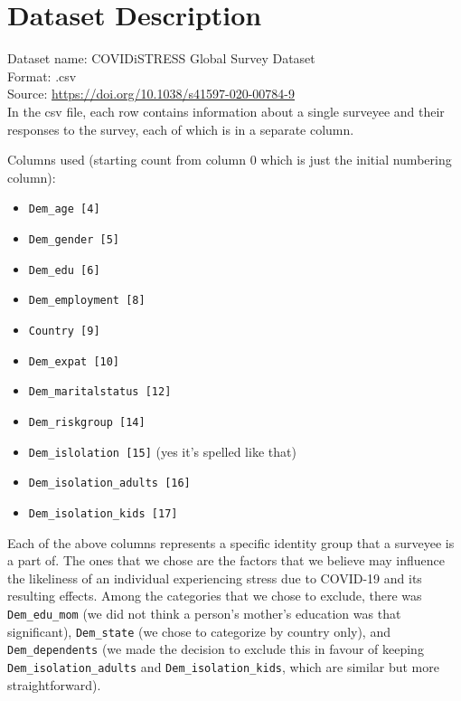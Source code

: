 \documentclass[fontsize=11pt]{article}
\begin{document}
    \section*{Dataset Description}

    Dataset name: COVIDiSTRESS Global Survey Dataset \\
    Format: .csv \\
    Source: \url{https://doi.org/10.1038/s41597-020-00784-9} \\

    In the csv file, each row contains information about a single surveyee and their responses to the survey, each of which is in a separate column.

    Columns used (starting count from column 0 which is just the initial numbering column):
    \begin{itemize}
    	\item \texttt{Dem\_age [4]} 
    	\item \texttt{Dem\_gender [5]} 
    	\item \texttt{Dem\_edu [6]} 
    	\item \texttt{Dem\_employment [8]} 
    	\item \texttt{Country [9]} 
    	\item \texttt{Dem\_expat [10]} 
    	\item \texttt{Dem\_maritalstatus [12]}  
    	\item \texttt{Dem\_riskgroup [14]} 
    	\item \texttt{Dem\_islolation [15]}  (yes it's spelled like that)
    	\item \texttt{Dem\_isolation\_adults [16]} 
    	\item \texttt{Dem\_isolation\_kids [17]} 
    \end{itemize}

    Each of the above columns represents a specific identity group that a surveyee is a part of. The ones that we chose are the factors that we believe may influence the likeliness of an individual experiencing stress due to COVID-19 and its resulting effects. Among the categories that we chose to exclude, there was \texttt{Dem\_edu\_mom} (we did not think a person’s mother’s education was that significant), \texttt{Dem\_state} (we chose to categorize by country only), and \texttt{Dem\_dependents} (we made the decision to exclude this in favour of keeping \texttt{Dem\_isolation\_adults} and \texttt{Dem\_isolation\_kids}, which are similar but more straightforward).
\end{document}
